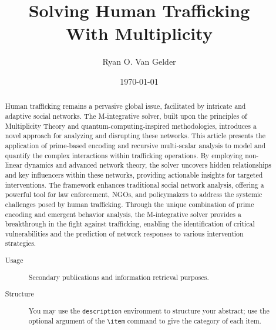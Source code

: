 \documentclass[%
 preprint, linenumbers,
 amsmath,amssymb,
 aps, physrev,
]{revtex4-2}
\begin{document}

\title{\textbf{Solving Human Trafficking \\ With Multiplicity} 
}%


\author{Ryan O. Van Gelder}

\date{\today}%

\begin{abstract}

\maketitle
Human trafficking remains a pervasive global issue, facilitated by intricate and adaptive social networks. The M-integrative solver, built upon the principles of Multiplicity Theory and quantum-computing-inspired methodologies, introduces a novel approach for analyzing and disrupting these networks. This article presents the application of prime-based encoding and recursive multi-scalar analysis to model and quantify the complex interactions within trafficking operations. By employing non-linear dynamics and advanced network theory, the solver uncovers hidden relationships and key influencers within these networks, providing actionable insights for targeted interventions. The framework enhances traditional social network analysis, offering a powerful tool for law enforcement, NGOs, and policymakers to address the systemic challenges posed by human trafficking. Through the unique combination of prime encoding and emergent behavior analysis, the M-integrative solver provides a breakthrough in the fight against trafficking, enabling the identification of critical vulnerabilities and the prediction of network responses to various intervention strategies.
\begin{description}
\item[Usage]
Secondary publications and information retrieval purposes.
\item[Structure]
You may use the \texttt{description} environment to structure your abstract;
use the optional argument of the \verb+\item+ command to give the category of each item. 
\end{description}
\end{abstract}

\maketitle
\end{document}
